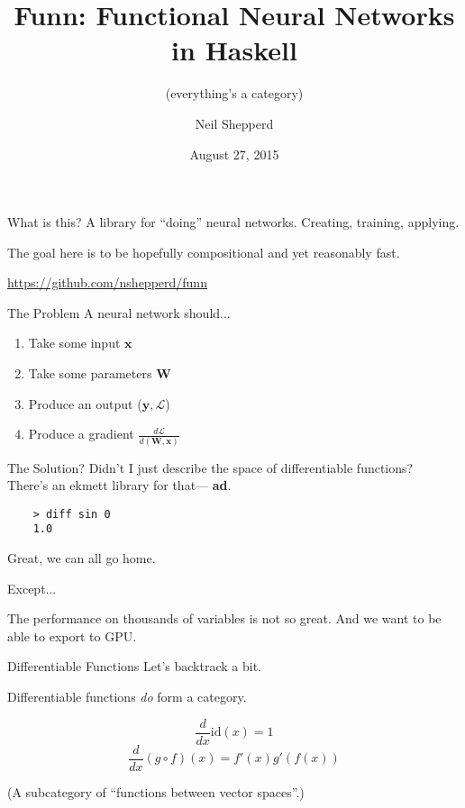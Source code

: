 \documentclass[10pt]{beamer}
\title{Funn: Functional Neural Networks in Haskell}
\subtitle{(everything's a category)}
\date{August 27, 2015}
\author{Neil Shepperd}
\newenvironment{xframe}[1][]{\begin{frame}[fragile,environment=xframe,#1]}{\end{frame}}
\begin{document}
\maketitle

\begin{xframe}{What is this?}
  A library for ``doing'' neural networks. Creating, training, applying.

  The goal here is to be hopefully compositional and yet reasonably fast.

  \url{https://github.com/nshepperd/funn}
\end{xframe}

\begin{xframe}{The Problem}
  A neural network should...
  \pause
  \begin{enumerate}
  \item Take some input $\mathbf{x}$ \pause
  \item Take some parameters $\mathbf{W}$ \pause
  \item Produce an output ($\mathbf{y}, \mathcal{L}$) \pause
  \item Produce a gradient $\frac{d\mathcal{L}}{d(\mathbf{W},\mathbf{x})}$
  \end{enumerate}
\end{xframe}

\begin{xframe}{The Solution?}
  Didn't I just describe the space of differentiable functions? \\
  There's an ekmett library for that\texttrademark \pause --- \textbf{ad}.

  \begin{verbatim}
    > diff sin 0
    1.0
  \end{verbatim}

  Great, we can all go home.

  Except...
  \pause

  The performance on thousands of variables is not so great.
  And we want to be able to export to GPU.
\end{xframe}

\begin{xframe}{Differentiable Functions}
  Let's backtrack a bit.

  Differentiable functions \emph{do} form a category.

  \[ \frac{d}{dx} \text{id}(x) = 1 \]
  \[ \frac{d}{dx} (g \circ f)(x) = f'(x) g'(f(x)) \]

  (A subcategory of ``functions between vector spaces''.)
\end{xframe}
\end{document}
